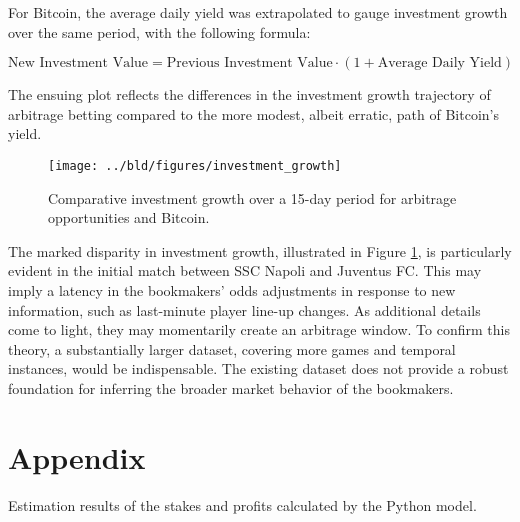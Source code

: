 \documentclass[11pt, a4paper, leqno]{article}
\begin{document}
For Bitcoin, the average daily yield was extrapolated to gauge investment growth over the same period, with the following formula:

\begin{equation}
    \text{New Investment Value} = \text{Previous Investment Value} \cdot \left(1 + \text{Average Daily Yield}\right)
\end{equation}

The ensuing plot reflects the differences in the investment growth trajectory of arbitrage betting compared to the more modest, albeit erratic, path of Bitcoin's yield.

\begin{figure}[H]
    \centering
    \texttt{[image: ../bld/figures/investment\_growth]}
    \caption{Comparative investment growth over a 15-day period for arbitrage opportunities and Bitcoin.}
    \label{fig:investment_growth_comparison}
\end{figure}

The marked disparity in investment growth, illustrated in Figure \ref{fig:investment_growth_comparison}, is particularly evident in the initial match between SSC Napoli and Juventus FC. This may imply a latency in the bookmakers' odds adjustments in response to new information, such as last-minute player line-up changes. As additional details come to light, they may momentarily create an arbitrage window. To confirm this theory, a substantially larger dataset, covering more games and temporal instances, would be indispensable. The existing dataset does not provide a robust foundation for inferring the broader market behavior of the bookmakers.

\printbibliography
{}


\clearpage
\appendix

\section*{Appendix}

\setcounter{table}{0}
\renewcommand{\thetable}{A\arabic{table}}

\begin{table}[H]
    \scalebox{0.65}{
        
    }
    \caption{Estimation results of the stakes and profits calculated by the Python model.}
    \label{tab:summary}
\end{table}
\end{document}

